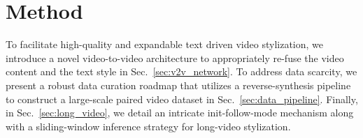 \documentclass[runningheads]{llncs}
\begin{document}

\section{Method}
To facilitate high-quality and expandable text driven video stylization, we introduce a novel video-to-video architecture to appropriately re-fuse the video content and the text style in Sec.~\ref{sec:v2v_network}. To address data scarcity, we present a robust data curation roadmap that utilizes a reverse-synthesis pipeline to construct a large-scale paired video dataset in Sec.~\ref{sec:data_pipeline}. Finally, in Sec.~\ref{sec:long_video}, we detail an intricate init-follow-mode mechanism along with a sliding-window inference strategy for long-video stylization. 

\end{document}
